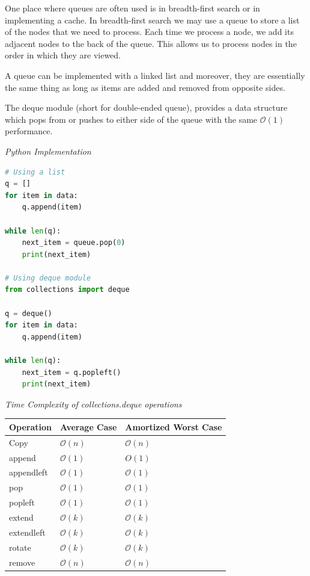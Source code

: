 \documentclass{article}
\newcommand{\bigO}{\mathcal{O}}
\begin{document}
    One place where queues are often used is in breadth-first search or in implementing a cache. In breadth-first search we may use a queue to store a list of the nodes that we need to process. Each time we process a node, we add its adjacent nodes to the back of the queue. This allows us to process nodes in the order in which they are viewed. 
    
    A queue can be implemented with a linked list and moreover, they are essentially the same thing as long as items are added and removed from opposite sides.
    
    The deque module (short for double-ended queue), provides a data structure which pops from or pushes to either side of the queue with the same $\bigO(1)$ performance. 
    
\vspace{8pt} \emph{Python Implementation}
\begin{lstlisting}[language=Python]
# Using a list 
q = []
for item in data:
    q.append(item) 

while len(q):
    next_item = queue.pop(0)
    print(next_item)

# Using deque module 
from collections import deque 

q = deque() 
for item in data:
    q.append(item) 
 
while len(q):
    next_item = q.popleft() 
    print(next_item)

\end{lstlisting}

    \vspace{8pt} \emph{Time Complexity of collections.deque operations}
    \begin{table}[H]
        \begin{tabular}{|l|l|l|}
            \hline
            \textbf{Operation} & \textbf{Average Case} & \textbf{Amortized Worst Case} \\
            \hline
            Copy & $\bigO(n)$ & $\bigO(n)$ \\
            append & $\bigO(1)$ & $O(1)$ \\
            appendleft & $\bigO(1)$ & $\bigO(1)$ \\
            pop & $\bigO(1)$ & $\bigO(1)$ \\
            popleft & $\bigO(1)$ & $\bigO(1)$ \\
            extend & $\bigO(k)$ & $\bigO(k)$ \\
            extendleft & $\bigO(k)$ & $\bigO(k)$ \\
            rotate & $\bigO(k)$ & $\bigO(k)$\\
            remove & $\bigO(n)$ & $\bigO(n)$\\
            \hline
        \end{tabular}
    \end{table}
\end{document}
